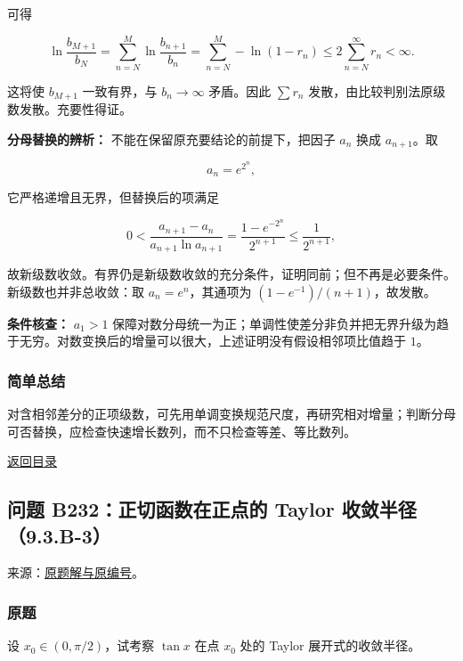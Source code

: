 \documentclass[11pt,a4paper]{article}
\begin{document}
可得

\[
\ln\frac{b_{M+1}}{b_N}
=\sum_{n=N}^{M}\ln\frac{b_{n+1}}{b_n}
=\sum_{n=N}^{M}-\ln(1-r_n)
\le2\sum_{n=N}^{\infty}r_n<\infty.
\]

这将使 \(b_{M+1}\) 一致有界，与 \(b_n\to\infty\) 矛盾。因此 \(\sum r_n\)
发散，由比较判别法原级数发散。充要性得证。

\textbf{分母替换的辨析：} 不能在保留原充要结论的前提下，把因子 \(a_n\)
换成 \(a_{n+1}\)。取

\[
a_n=e^{2^n},
\]

它严格递增且无界，但替换后的项满足

\[
0<\frac{a_{n+1}-a_n}{a_{n+1}\ln a_{n+1}}
=\frac{1-e^{-2^n}}{2^{n+1}}\le\frac1{2^{n+1}},
\]

故新级数收敛。有界仍是新级数收敛的充分条件，证明同前；但不再是必要条件。新级数也并非总收敛：取
\(a_n=e^n\)，其通项为 \((1-e^{-1})/(n+1)\)，故发散。

\textbf{条件核查：} \(a_1>1\)
保障对数分母统一为正；单调性使差分非负并把无界升级为趋于无穷。对数变换后的增量可以很大，上述证明没有假设相邻项比值趋于
\(1\)。

\subsubsection{简单总结}\label{ux7b80ux5355ux603bux7ed3-27}

对含相邻差分的正项级数，可先用单调变换规范尺度，再研究相对增量；判断分母可否替换，应检查快速增长数列，而不只检查等差、等比数列。

\noindent\hyperref[contents]{返回目录}

\subsection{问题 B232：正切函数在正点的 Taylor
收敛半径（9.3.B-3）}\label{ux95eeux9898-b232ux6b63ux5207ux51fdux6570ux5728ux6b63ux70b9ux7684-taylor-ux6536ux655bux534aux5f849.3.b-3}

来源：\href{https://zj139.github.io/math-notes/problems/41a8fc025daa4bef6a32b3d1/\#问题-b232}{原题解与原编号}。

\subsubsection{原题}\label{ux539fux9898-28}

设 \(x_0\in(0,\pi/2)\)，试考察 \(\tan x\) 在点 \(x_0\) 处的 Taylor
展开式的收敛半径。
\end{document}
